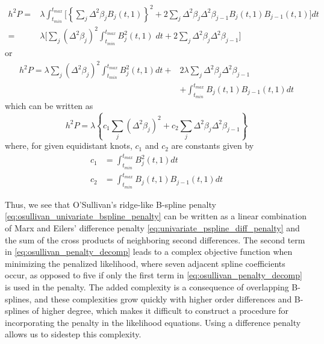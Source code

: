 \documentclass[12pt]{article}
\begin{document}
\begin{align}
h^2 P = {} & \lambda \int_{t_{min}}^{t_{max}} \bigg[ \left\{ \sum_{j}  \Delta^2 \beta_j  B_j\left(t,1\right)  \right\}^2  + 2 \sum_{j}\Delta^2 \beta_j\Delta^2 \beta_{j-1}B_j\left(t,1\right)B_{j-1}\left(t,1\right) \bigg] dt \nonumber \\ 
= {} & \lambda \bigg[ \sum_j \left( \Delta^2\beta_j \right)^2 \int_{t_{min}}^{t_{max}} B_j^2\left(t,1\right)\;dt + 2 \sum_j \Delta^2 \beta_j\Delta^2 \beta_{j-1} \bigg]
\end{align}
\noindent
or
\begin{align}
h^2 P = \lambda \sum_j \left( \Delta^2\beta_j \right)^2 \int_{t_{min}}^{t_{max}} B_j^2\left(t,1\right) dt + {} & 2\lambda \sum_j \Delta^2 \beta_j \Delta^2 \beta_{j-1}  \nonumber \\ 
{} &+\int_{t_{min}}^{t_{max}} B_j\left(t,1\right)B_{j-1}\left(t,1\right) dt
\end{align}
\noindent
which can be written as
\begin{equation} \label{eq:osullivan_penalty_decomp}
h^2 P = \lambda\left\{c_1 \sum_j\left( \Delta^2 \beta_j\right)^2 + c_2 \sum_j\Delta^2 \beta_j\Delta^2 \beta_{j-1} \right\}
\end{equation}
\noindent
where, for given equidistant knots, $c_1$ and $c_2$ are constants given by
\begin{equation}
\begin{split}
c_1 & =   \int_{t_{min}}^{t_{max}} B_j^2\left(t,1\right) dt\\
c_2 & = \int_{t_{min}}^{t_{max}} B_j\left(t,1\right)B_{j-1}\left(t,1\right) dt
\end{split}
\end{equation}

Thus, we see that O'Sullivan's ridge-like B-spline penalty \ref{eq:osullivan_univariate_bspline_penalty} can be written as a linear combination of Marx and Eilers' difference penalty \ref{eq:univariate_pspline_diff_penalty} and the sum of the cross products of neighboring second differences. The second term in \ref{eq:osullivan_penalty_decomp} leads to a complex objective function when minimizing the penalized likelihood, where seven adjacent spline coefficients occur, as opposed to five if only the first term in \ref{eq:osullivan_penalty_decomp} is used in the penalty. The added complexity is a consequence of overlapping B-splines, and these complexities grow quickly with higher order differences and B-splines of higher degree, which makes it difficult to construct a procedure for incorporating the penalty in the likelihood equations. Using a difference penalty allows us to sidestep this complexity.
\end{document}

